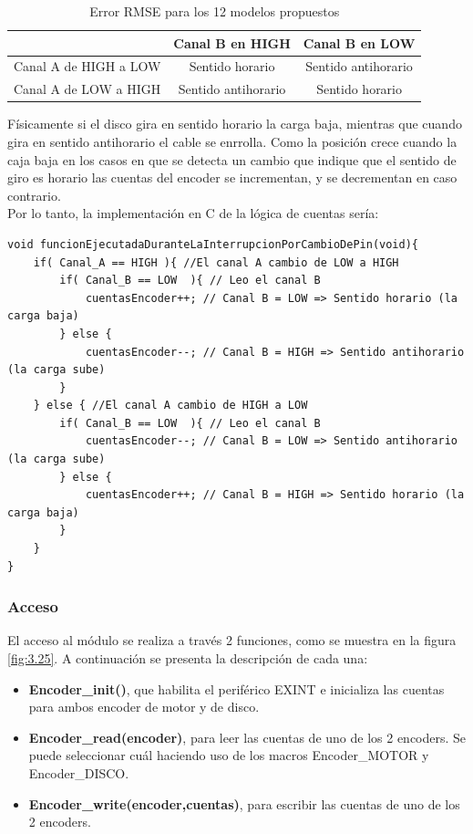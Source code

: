 \begin{table}[!ht]
	\begin{center}
		
		\begin{tabular}{|c|c|c|}
			\hline
			 & Canal B en HIGH & Canal B en LOW   \\
			\hline 
			Canal A de HIGH a LOW & Sentido horario & Sentido antihorario\\
			\hline 
			Canal A de LOW a HIGH & Sentido antihorario & Sentido horario\\
			\hline
		\end{tabular}
	\end{center}
	\caption{Error RMSE para los 12 modelos propuestos}
	\label{table:\thetable}
\end{table}

Físicamente si el disco gira en sentido horario la carga baja, mientras que cuando gira en sentido antihorario el cable se enrrolla. Como la posición crece cuando la caja baja en los casos en que se detecta un cambio que indique que el sentido de giro es horario las cuentas del encoder se incrementan, y se decrementan en caso contrario.\\
Por lo tanto, la implementación en C de la lógica de cuentas sería:
\begin{lstlisting}[style=CStyle]
void funcionEjecutadaDuranteLaInterrupcionPorCambioDePin(void){
	if( Canal_A == HIGH ){ //El canal A cambio de LOW a HIGH
		if( Canal_B == LOW  ){ // Leo el canal B
			cuentasEncoder++; // Canal B = LOW => Sentido horario (la carga baja)
		} else {
			cuentasEncoder--; // Canal B = HIGH => Sentido antihorario (la carga sube)
		}
	} else { //El canal A cambio de HIGH a LOW
		if( Canal_B == LOW  ){ // Leo el canal B
			cuentasEncoder--; // Canal B = LOW => Sentido antihorario (la carga sube)
		} else {
			cuentasEncoder++; // Canal B = HIGH => Sentido horario (la carga baja)
		}
	}
}
\end{lstlisting}

\subsubsection{Acceso}
El acceso al módulo se realiza a través 2 funciones, como se muestra en la figura \ref{fig:3.25}. A continuación se presenta la descripción de cada una:
\begin{itemize}
	\item \textbf{Encoder\_init()}, que habilita el periférico EXINT e inicializa las cuentas para ambos encoder de motor y de disco.
	\item \textbf{Encoder\_read(encoder)}, para leer las cuentas de uno de los 2 encoders. Se puede seleccionar cuál haciendo uso de los macros Encoder\_MOTOR y Encoder\_DISCO. 
	\item \textbf{Encoder\_write(encoder,cuentas)}, para escribir las cuentas de uno de los 2 encoders.
\end{itemize}

